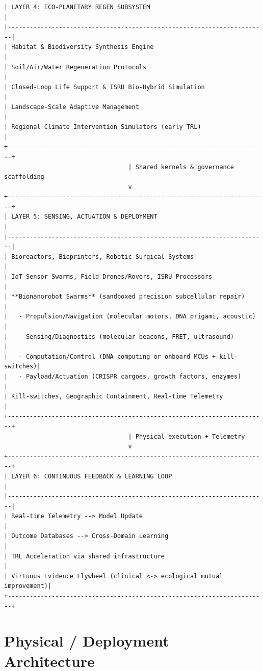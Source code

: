 \documentclass[11pt,a4paper]{report}
\begin{document}
\begin{lstlisting}[style=asciistyle, caption={URTE High-Level Layered Architecture --- Precise Capability Stack}]
| LAYER 4: ECO-PLANETARY REGEN SUBSYSTEM                                |
|-----------------------------------------------------------------------|
| Habitat & Biodiversity Synthesis Engine                               |
| Soil/Air/Water Regeneration Protocols                                 |
| Closed-Loop Life Support & ISRU Bio-Hybrid Simulation                 |
| Landscape-Scale Adaptive Management                                   |
| Regional Climate Intervention Simulators (early TRL)                  |
+-----------------------------------------------------------------------+
                                  | Shared kernels & governance scaffolding
                                  v
+-----------------------------------------------------------------------+
| LAYER 5: SENSING, ACTUATION & DEPLOYMENT                              |
|-----------------------------------------------------------------------|
| Bioreactors, Bioprinters, Robotic Surgical Systems                    |
| IoT Sensor Swarms, Field Drones/Rovers, ISRU Processors               |
| **Bionanorobot Swarms** (sandboxed precision subcellular repair)      |
|   - Propulsion/Navigation (molecular motors, DNA origami, acoustic)   |
|   - Sensing/Diagnostics (molecular beacons, FRET, ultrasound)         |
|   - Computation/Control (DNA computing or onboard MCUs + kill-switches)|
|   - Payload/Actuation (CRISPR cargoes, growth factors, enzymes)       |
| Kill-switches, Geographic Containment, Real-time Telemetry            |
+-----------------------------------------------------------------------+
                                  | Physical execution + Telemetry
                                  v
+-----------------------------------------------------------------------+
| LAYER 6: CONTINUOUS FEEDBACK & LEARNING LOOP                          |
|-----------------------------------------------------------------------|
| Real-time Telemetry --> Model Update                                  |
| Outcome Databases --> Cross-Domain Learning                           |
| TRL Acceleration via shared infrastructure                            |
| Virtuous Evidence Flywheel (clinical <-> ecological mutual improvement)|
+-----------------------------------------------------------------------+
\end{lstlisting}

\section{Physical / Deployment Architecture}
\end{document}
